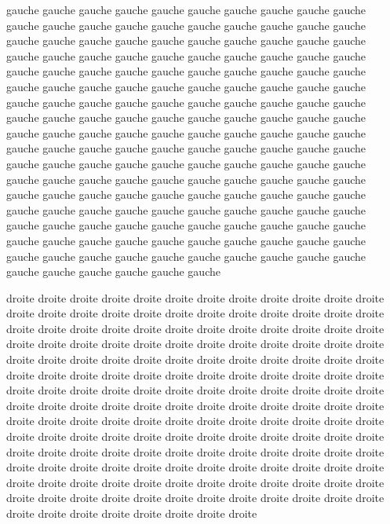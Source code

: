 \documentclass[openany]{book}
\begin{document}
\begin{pages}

\begin{Leftside}
  \beginnumbering



\pstart
gauche gauche gauche gauche gauche gauche gauche gauche gauche gauche
gauche gauche gauche gauche gauche gauche gauche gauche gauche gauche
gauche gauche gauche gauche gauche gauche gauche gauche gauche gauche
gauche gauche gauche gauche gauche gauche gauche gauche gauche gauche
gauche gauche gauche gauche gauche gauche gauche gauche gauche gauche
gauche gauche gauche gauche gauche gauche gauche gauche gauche gauche
gauche gauche gauche gauche gauche gauche gauche gauche gauche gauche
gauche gauche gauche gauche gauche gauche gauche gauche gauche gauche
gauche gauche gauche gauche gauche gauche gauche gauche gauche gauche
gauche gauche gauche gauche gauche gauche gauche gauche gauche gauche
gauche gauche gauche gauche gauche gauche gauche gauche gauche gauche
gauche gauche gauche gauche gauche gauche gauche gauche gauche gauche
gauche gauche gauche gauche gauche gauche gauche gauche gauche gauche
gauche gauche gauche gauche gauche gauche gauche gauche gauche gauche
gauche gauche gauche gauche gauche gauche gauche gauche gauche gauche
gauche gauche gauche gauche gauche gauche gauche gauche gauche gauche
gauche gauche gauche gauche gauche gauche gauche gauche gauche gauche
gauche gauche gauche gauche gauche gauche
\pend

  \endnumbering
\end{Leftside}

\begin{Rightside}
\beginnumbering


\pstart
droite droite droite droite droite droite droite droite droite droite
droite droite droite droite droite droite droite droite droite droite
droite droite droite droite droite droite droite droite droite droite
droite droite droite droite droite droite droite droite droite droite
droite droite droite droite droite droite droite droite droite droite
droite droite droite droite droite droite droite droite droite droite
droite droite droite droite droite droite droite droite droite droite
droite droite droite droite droite droite droite droite droite droite
droite droite droite droite droite droite droite droite droite droite
droite droite droite droite droite droite droite droite droite droite
droite droite droite droite droite droite droite droite droite droite
droite droite droite droite droite droite droite droite droite droite
droite droite droite droite droite droite droite droite droite droite
droite droite droite droite droite droite droite droite droite droite
droite droite droite droite droite droite droite droite droite droite
droite droite droite droite droite droite droite droite droite droite
droite droite droite droite droite droite droite droite droite droite
droite droite droite droite droite droite
\pend

\endnumbering  
\end{Rightside}

\end{pages}
\end{document}
